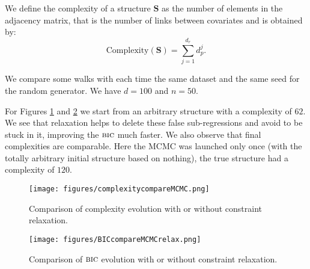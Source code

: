 \documentclass[12pt,a4paper]{report}
\begin{document}
We define the complexity of a structure $\boldsymbol{S}$ as the number of elements in the adjacency matrix, that is the number of links between covariates and is obtained by:
\begin{equation}
	\textrm{Complexity}(\boldsymbol{S})=\sum_{j=1}^{d_r}d_p^j. \nonumber
\end{equation}	
	
		We compare some walks with each time the same dataset and the same seed for the random generator. We have $d=100$ and $n=50$.
		
		For Figures \ref{comparecomplrelax} and \ref{compareBICrelax} we start from an arbitrary structure with a complexity of $62$. We see that relaxation helps to delete these false sub-regressions and avoid to be stuck in it, improving the $\mbox{{\sc bic}}$ much faster. We also observe that final complexities are comparable. Here the MCMC was launched only once (with the totally arbitrary initial structure based on nothing), the true structure had a complexity of $120$.
		
\begin{center}
	\begin{figure}[h!]
	\centering
\texttt{[image: figures/complexitycompareMCMC.png]} 		
\caption{Comparison of complexity evolution with or without constraint relaxation.}\label{comparecomplrelax}
	\end{figure}
	\end{center}
			
\begin{center}
	\begin{figure}[h!]
	\centering
\texttt{[image: figures/BICcompareMCMCrelax.png]} 		
\caption{Comparison of $\mbox{{\sc bic}}$ evolution with or without constraint relaxation.}\label{compareBICrelax}
	\end{figure}
	\end{center}
	
\FloatBarrier
\end{document}
